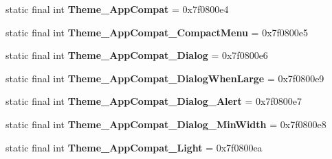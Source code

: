 \begin{DoxyCompactItemize}
\item 
\hypertarget{classandroid_1_1support_1_1v7_1_1appcompat_1_1_r_1_1style_a36039e9a627267e186a60d97337bdde1}{}static final int {\bfseries Theme\+\_\+\+App\+Compat} = 0x7f0800e4\label{classandroid_1_1support_1_1v7_1_1appcompat_1_1_r_1_1style_a36039e9a627267e186a60d97337bdde1}

\item 
\hypertarget{classandroid_1_1support_1_1v7_1_1appcompat_1_1_r_1_1style_af47c390e032a3ca9e7d85968a3f4fa18}{}static final int {\bfseries Theme\+\_\+\+App\+Compat\+\_\+\+Compact\+Menu} = 0x7f0800e5\label{classandroid_1_1support_1_1v7_1_1appcompat_1_1_r_1_1style_af47c390e032a3ca9e7d85968a3f4fa18}

\item 
\hypertarget{classandroid_1_1support_1_1v7_1_1appcompat_1_1_r_1_1style_aa947f8c647b055078c8ff2b8c77e1729}{}static final int {\bfseries Theme\+\_\+\+App\+Compat\+\_\+\+Dialog} = 0x7f0800e6\label{classandroid_1_1support_1_1v7_1_1appcompat_1_1_r_1_1style_aa947f8c647b055078c8ff2b8c77e1729}

\item 
\hypertarget{classandroid_1_1support_1_1v7_1_1appcompat_1_1_r_1_1style_a254c8c935e481bde88dba99a52d72059}{}static final int {\bfseries Theme\+\_\+\+App\+Compat\+\_\+\+Dialog\+When\+Large} = 0x7f0800e9\label{classandroid_1_1support_1_1v7_1_1appcompat_1_1_r_1_1style_a254c8c935e481bde88dba99a52d72059}

\item 
\hypertarget{classandroid_1_1support_1_1v7_1_1appcompat_1_1_r_1_1style_ac75a05a56cc31d2f09bcb4f4333ce197}{}static final int {\bfseries Theme\+\_\+\+App\+Compat\+\_\+\+Dialog\+\_\+\+Alert} = 0x7f0800e7\label{classandroid_1_1support_1_1v7_1_1appcompat_1_1_r_1_1style_ac75a05a56cc31d2f09bcb4f4333ce197}

\item 
\hypertarget{classandroid_1_1support_1_1v7_1_1appcompat_1_1_r_1_1style_a7da7f25d0d41b1aedcd0191db68fba8d}{}static final int {\bfseries Theme\+\_\+\+App\+Compat\+\_\+\+Dialog\+\_\+\+Min\+Width} = 0x7f0800e8\label{classandroid_1_1support_1_1v7_1_1appcompat_1_1_r_1_1style_a7da7f25d0d41b1aedcd0191db68fba8d}

\item 
\hypertarget{classandroid_1_1support_1_1v7_1_1appcompat_1_1_r_1_1style_a23c0b66055cf7effa3936aacc729427f}{}static final int {\bfseries Theme\+\_\+\+App\+Compat\+\_\+\+Light} = 0x7f0800ea\label{classandroid_1_1support_1_1v7_1_1appcompat_1_1_r_1_1style_a23c0b66055cf7effa3936aacc729427f}


\end{DoxyCompactItemize}
